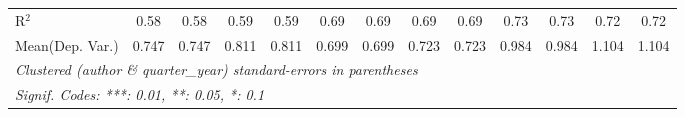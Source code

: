 \begin{tabular}{lcccccccccccc}
   R$^2$                                    & 0.58    & 0.58          & 0.59    & 0.59         & 0.69    & 0.69    & 0.69    & 0.69          & 0.73    & 0.73          & 0.72    & 0.72\\  
Mean(Dep. Var.) & 0.747 & 0.747 & 0.811 & 0.811 & 0.699 & 0.699 & 0.723 & 0.723 & 0.984 & 0.984 & 1.104 & 1.104 \\
   \midrule \midrule
   \multicolumn{13}{l}{\emph{Clustered (author \& quarter\_year) standard-errors in parentheses}}\\
   \multicolumn{13}{l}{\emph{Signif. Codes: ***: 0.01, **: 0.05, *: 0.1}}\\
\end{tabular}
\par\endgroup
